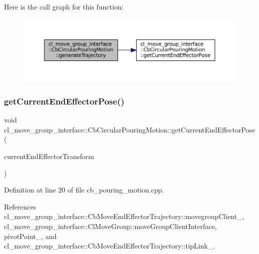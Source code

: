 Here is the call graph for this function\+:
\nopagebreak
\begin{figure}[H]
\begin{center}
\leavevmode
\includegraphics[width=350pt]{classcl__move__group__interface_1_1CbCircularPouringMotion_a9150bb3731082aad3af2d7d6e067a344_cgraph}
\end{center}
\end{figure}
\mbox{\label{classcl__move__group__interface_1_1CbCircularPouringMotion_a0cc72cc5233ecb0c264621d4d9501b30}} 
\subsubsection{\texorpdfstring{get\+Current\+End\+Effector\+Pose()}{getCurrentEndEffectorPose()}}
{\footnotesize\ttfamily void cl\+\_\+move\+\_\+group\+\_\+interface\+::\+Cb\+Circular\+Pouring\+Motion\+::get\+Current\+End\+Effector\+Pose (\begin{DoxyParamCaption}\item[{tf\+::\+Stamped\+Transform \&}]{current\+End\+Effector\+Transform }\end{DoxyParamCaption})}



Definition at line 20 of file cb\+\_\+pouring\+\_\+motion.\+cpp.



References cl\+\_\+move\+\_\+group\+\_\+interface\+::\+Cb\+Move\+End\+Effector\+Trajectory\+::movegroup\+Client\+\_\+, cl\+\_\+move\+\_\+group\+\_\+interface\+::\+Cl\+Move\+Group\+::move\+Group\+Client\+Interface, pivot\+Point\+\_\+, and cl\+\_\+move\+\_\+group\+\_\+interface\+::\+Cb\+Move\+End\+Effector\+Trajectory\+::tip\+Link\+\_\+.



